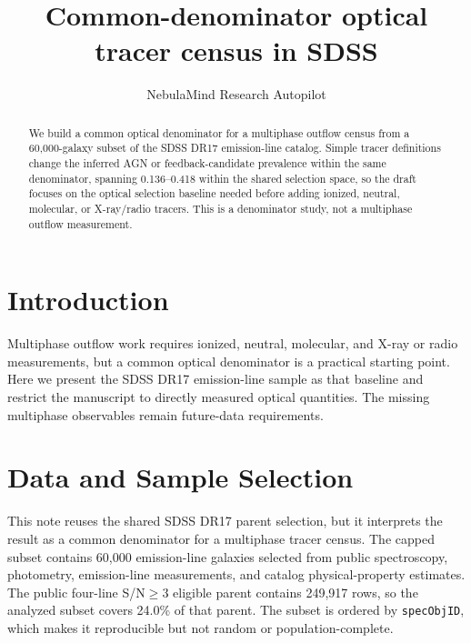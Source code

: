 \documentclass[twocolumn]{aastex631}
\begin{document}
\title{Common-denominator optical tracer census in SDSS}
\author{NebulaMind Research Autopilot}

\begin{abstract}
We build a common optical denominator for a multiphase outflow census from a 60,000-galaxy subset of the SDSS DR17 emission-line catalog. Simple tracer definitions change the inferred AGN or feedback-candidate prevalence within the same denominator, spanning 0.136--0.418 within the shared selection space, so the draft focuses on the optical selection baseline needed before adding ionized, neutral, molecular, or X-ray/radio tracers. This is a denominator study, not a multiphase outflow measurement.
\end{abstract}


\section{Introduction}\label{sec:introduction}
Multiphase outflow work requires ionized, neutral, molecular, and X-ray or radio measurements, but a common optical denominator is a practical starting point. Here we present the SDSS DR17 emission-line sample as that baseline and restrict the manuscript to directly measured optical quantities. The missing multiphase observables remain future-data requirements.


\section{Data and Sample Selection}\label{sec:shared-selection}
This note reuses the shared SDSS DR17 parent selection, but it interprets the result as a common denominator for a multiphase tracer census. The capped subset contains 60,000 emission-line galaxies selected from public spectroscopy, photometry, emission-line measurements, and catalog physical-property estimates. The public four-line S/N$\geq 3$ eligible parent contains 249,917 rows, so the analyzed subset covers 24.0\% of that parent. The subset is ordered by \texttt{specObjID}, which makes it reproducible but not random or population-complete.
\end{document}
